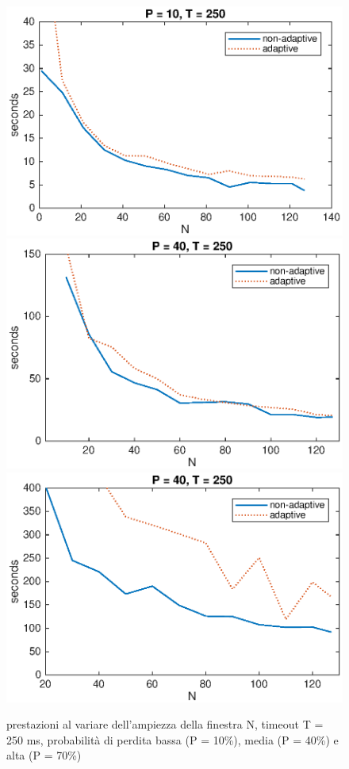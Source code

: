 \begin{figure}[!hp]
	\includegraphics[scale=0.5]{images/N_T250_P10}
	\includegraphics[scale=0.5]{images/N_T250_P40}
	\includegraphics[scale=0.5]{images/N_T250_P70}
	\caption{prestazioni al variare dell'ampiezza della finestra N,
			 timeout T = 250 ms, probabilità di perdita bassa (P = 10\%),
			 media (P = 40\%) e alta (P = 70\%)}
	\label{n2}
\end{figure}
